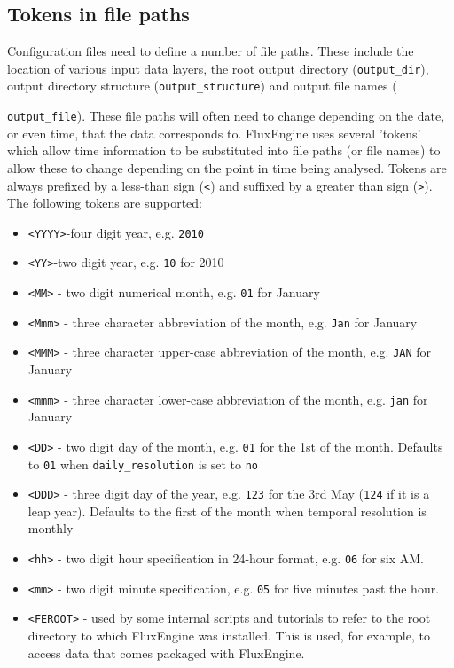 \documentclass[]{scrartcl}
\begin{document}
\subsection{Tokens in file paths} \label{tokens}
Configuration files need to define a number of file paths. These include the location of various input data layers, the root output directory (\texttt{output\_dir}), output directory structure (\texttt{output\_structure}) and output file names ({\texttt{output\_file}). These file paths will often need to change depending on the date, or even time, that the data corresponds to. FluxEngine uses several 'tokens' which allow time information to be substituted into file paths (or file names) to allow these to change depending on the point in time being analysed. Tokens are always prefixed by a less-than sign (\texttt{<}) and suffixed by a greater than sign (\texttt{>}). The following tokens are supported:
\begin{itemize}
	\item {\texttt{<YYYY>}-four digit year, e.g. \texttt{2010}}
	\item {\texttt{<YY>}-two digit year, e.g. \texttt{10} for 2010}
	\item {\texttt{<MM>} - two digit numerical month, e.g. \texttt{01} for January}
	\item {\texttt{<Mmm>} - three character abbreviation of the month, e.g. \texttt{Jan} for January}
	\item {\texttt{<MMM>} - three character upper-case abbreviation of the month, e.g. \texttt{JAN} for January}
	\item {\texttt{<mmm>} - three character lower-case abbreviation of the month, e.g. \texttt{jan} for January}
	\item {\texttt{<DD>} - two digit day of the month, e.g. \texttt{01} for the 1st of the month. Defaults to \texttt{01} when \texttt{daily\_resolution} is set to \texttt{no}}
	\item {\texttt{<DDD>} - three digit day of the year, e.g. \texttt{123} for the 3rd May (\texttt{124} if it is a leap year). Defaults to the first of the month when temporal resolution is monthly}
	\item {\texttt{<hh>} - two digit hour specification in 24-hour format, e.g. \texttt{06} for six AM.}
	\item {\texttt{<mm>} - two digit minute specification, e.g. \texttt{05} for five minutes past the hour.}
	\item {\texttt{<FEROOT>} - used by some internal scripts and tutorials to refer to the root directory to which FluxEngine was installed. This is used, for example, to access data that comes packaged with FluxEngine.}
\end{itemize}


}
\end{document}
